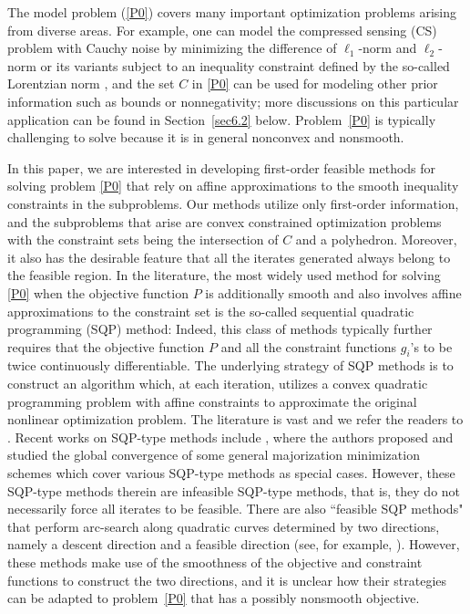 \documentclass[10pt]{article}
\numberwithin{equation}{section}
\begin{document}
The model problem (\ref{P0}) covers many important optimization problems arising from diverse areas. For example, one can model the compressed sensing (CS) problem with Cauchy noise by minimizing the difference of $\ell_1$-norm and $\ell_2$-norm \cite{YiLH15} or its variants subject to an inequality constraint defined by the so-called Lorentzian norm \cite{CaBA10}, and the set $C$ in \eqref{P0} can be used for modeling other prior information such as bounds or nonnegativity; more discussions on this particular application can be found in Section~\ref{sec6.2} below. Problem~\eqref{P0} is typically challenging to solve because it is in general nonconvex and nonsmooth.%

In this paper, we are interested in developing first-order feasible methods for solving problem \eqref{P0} that rely on affine approximations to the smooth inequality constraints in the subproblems. Our methods utilize only first-order information, and the subproblems that arise are convex constrained optimization problems with the constraint sets being the intersection of $C$ and a polyhedron. %
 Moreover, it also has the desirable feature that  all the iterates generated always belong to the feasible region. In the literature, the most widely used method for solving \eqref{P0} when the objective function $P$ is additionally smooth and also involves affine approximations to the constraint set is the so-called sequential quadratic programming (SQP) method: Indeed, this class of methods typically further requires that the objective function $P$ and all the constraint functions $g_i$'s to be twice continuously differentiable. The underlying strategy of SQP methods is to construct an algorithm which, at each iteration, utilizes a convex quadratic programming problem with affine constraints to approximate the original nonlinear optimization problem. The literature is vast and we refer the readers to \cite{AcDeJa21,Ber95,NoWr06,GiWo12,FlGL02,So09,Au13,BoPau16,WrightTenny04,PaTi93,FlPa08,LawTits01}.
Recent works on SQP-type methods include \cite{Au13,BoPau16}, where the authors proposed and studied the global convergence of some general majorization minimization schemes which cover various SQP-type methods as special cases. However, these SQP-type methods therein are infeasible SQP-type methods, that is, they do not necessarily force all iterates to be feasible. There are also ``feasible SQP methods" that perform arc-search along quadratic curves determined by two directions, namely a descent direction and a feasible direction (see, for example, \cite{PaTi93,FlPa08,LawTits01}). However, these methods make use of the smoothness of the objective and constraint functions to construct the two directions, and it is unclear how their strategies can be adapted to problem~\eqref{P0} that has a possibly nonsmooth objective.
\end{document}
